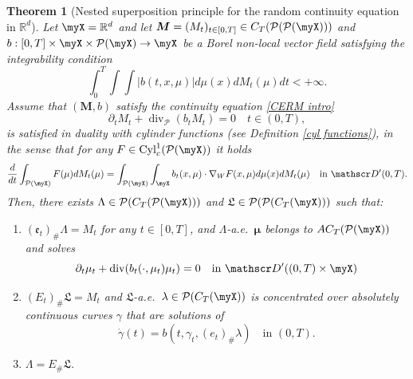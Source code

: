 \documentclass[10pt,leqno]{amsart}
\numberwithin{equation}{section}
\newtheorem{teorema}{Theorem}[section]
\newcommand{\R}{\mathbb{R}}
\newcommand{\PP}{\mathcal{P}}
\begin{document}
\begin{teorema}[Nested superposition principle for the random continuity equation in $\R^d$]\label{main theorem}
    Let $\myX=\R^d$ and let $\boldsymbol{M}=(M_t)_{t\in [0,T]}\in C_T(\PP(\PP(\myX)))$ and $b:[0,T]\times \myX \times \PP(\myX) \to \myX $ be a 
    Borel non-local vector field satisfying the integrability condition
    $$\int_0^T \int \int |b(t,x,\mu)| d\mu(x) dM_t(\mu) dt <+\infty.$$
    \nc%
    Assume that 
    $(\boldsymbol{M},b)$
    satisfy the continuity equation \eqref{CERM intro}
    \begin{equation}
    \label{eq:CERM2}
        \partial_tM_t + \operatorname{div}_{\PP}(b_tM_t)=0\quad t\in (0,T),
    \end{equation}
    is satisfied 
    in duality with cylinder functions (see Definition \ref{cyl functions}), in the sense that for any $F\in \operatorname{Cyl}_c^1(\PP(\myX))$ it holds
    \begin{equation}
        \label{eq:continuity-test-intro}
    \frac{d}{dt}\int_{\PP(\myX)}F(\mu) dM_t(\mu) = \int_{\PP(\myX)}\int_{\myX} b_t(x,\mu)\cdot \nabla_W F(x,\mu) d\mu(x) dM_t(\mu)\quad\text{in }\mathscr D'(0,T).
    \end{equation}
    Then, there exists $\Lambda\in \PP(C_T(\PP(\myX)))$ and $\mathfrak{L}\in \PP(\PP(C_T(\myX)))$ such that:
    \begin{enumerate}
        \item\label{prop of Lambda R^d} $(\mathfrak{e}_t)_{\#}\Lambda = M_t$ for any $t\in [0,T]$, 
        and $\Lambda$-a.e.~$\boldsymbol{\mu}$ belongs to $
        AC_T(\PP(\myX))$ 
        and solves 
        $$\partial_t\mu_t + \operatorname{div}(b_t(\cdot,\mu_t)\mu_t)=0
        \quad\text{in }\mathscr D'((0,T)\times \myX)$$
        \item\label{properties of L R^d} $(E_t)_\#\mathfrak{L}=M_t$
        and $\mathfrak{L}$-a.e.~$\lambda\in \PP(C_T(\myX))$
        is concentrated over 
        absolutely continuous curves 
        $\gamma$ that are solutions of
        $$\dot{\gamma}(t) = b(t,\gamma_t,(e_t)_\#\lambda)\quad\text{in }(0,T).$$
        \item\label{third property} $\Lambda = E_\#\mathfrak{L}$.
    \end{enumerate}
\end{teorema}
\end{document}
